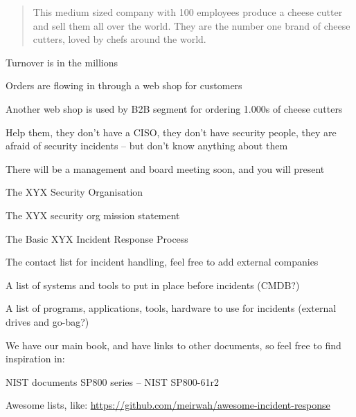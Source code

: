 \documentclass[Screen16to9,17pt]{foils}
\begin{document}


\begin{quote}
This medium sized company with 100 employees produce a cheese cutter and sell them all over the world. They are the number one brand of cheese cutters, loved by chefs around the world.
\end{quote}

\begin{list2}
\item Turnover is in the millions
\item Orders are flowing in through a web shop for customers
\item Another web shop is used by B2B segment for ordering 1.000s of cheese cutters
\end{list2}

Help them, they don't have a CISO, they don't have security people, they are afraid of security incidents -- but don't know anything about them




There will be a management and board meeting soon, and you will present

\begin{list2}
\item The XYX Security Organisation
\item The XYX security org mission statement
\item The Basic XYX Incident Response Process
\item The contact list for incident handling, feel free to add external companies
\item A list of systems and tools to put in place before incidents (CMDB?)
\item A list of programs, applications, tools, hardware to use for incidents (external drives and go-bag?)
\end{list2}



We have our main book, and have links to other documents, so feel free to find inspiration in:

\begin{list2}
\item NIST documents SP800 series -- NIST SP800-61r2
\item Awesome lists, like: \url{https://github.com/meirwah/awesome-incident-response}
\end{list2}
\end{document}
